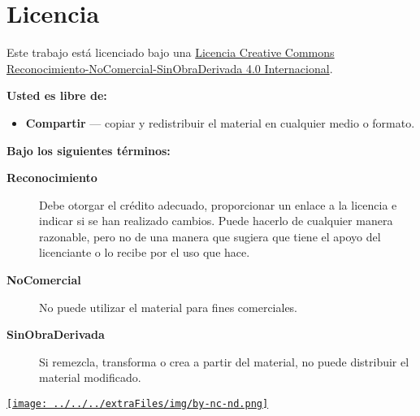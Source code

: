 \section*{Licencia}

Este trabajo está licenciado bajo una 
\href{https://creativecommons.org/licenses/by-nc-nd/4.0/}{Licencia Creative Commons Reconocimiento-NoComercial-SinObraDerivada 4.0 Internacional}.

\bigskip

\textbf{Usted es libre de:}
\begin{itemize}
  \item \textbf{Compartir} — copiar y redistribuir el material en cualquier medio o formato.
\end{itemize}

\bigskip

\textbf{Bajo los siguientes términos:}
\begin{description}
  \item[\textbf{Reconocimiento}] Debe otorgar el crédito adecuado, proporcionar un enlace a la licencia e indicar si se han realizado cambios. Puede hacerlo de cualquier manera razonable, pero no de una manera que sugiera que tiene el apoyo del licenciante o lo recibe por el uso que hace.

  \item[\textbf{NoComercial}] No puede utilizar el material para fines comerciales.

  \item[\textbf{SinObraDerivada}] Si remezcla, transforma o crea a partir del material, no puede distribuir el material modificado.
\end{description}

\bigskip

\begin{center}
  \href{https://creativecommons.org/licenses/by-nc-nd/4.0/}{\texttt{[image: ../../../extraFiles/img/by-nc-nd.png]}}
\end{center}
